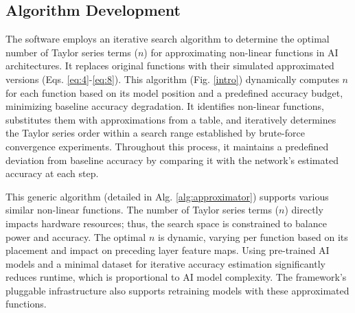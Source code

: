 \documentclass[conference,10pt]{IEEEtran}
\begin{document}
\subsection{Algorithm Development}
The software employs an iterative search algorithm to determine the optimal number of Taylor series terms ($n$) for approximating non-linear functions in AI architectures. It replaces original functions with their simulated approximated versions (Eqs. \ref{eq:4}-\ref{eq:8}). This algorithm (Fig. \ref{intro}) dynamically computes $n$ for each function based on its model position and a predefined accuracy budget, minimizing baseline accuracy degradation. It identifies non-linear functions, substitutes them with approximations from a table, and iteratively determines the Taylor series order within a search range established by brute-force convergence experiments. Throughout this process, it maintains a predefined deviation from baseline accuracy by comparing it with the network's estimated accuracy at each step.

This generic algorithm (detailed in Alg. \ref{alg:approximator}) supports various similar non-linear functions. The number of Taylor series terms ($n$) directly impacts hardware resources; thus, the search space is constrained to balance power and accuracy. The optimal $n$ is dynamic, varying per function based on its placement and impact on preceding layer feature maps. Using pre-trained AI models and a minimal dataset for iterative accuracy estimation significantly reduces runtime, which is proportional to AI model complexity. The framework's pluggable infrastructure also supports retraining models with these approximated functions.
\end{document}
